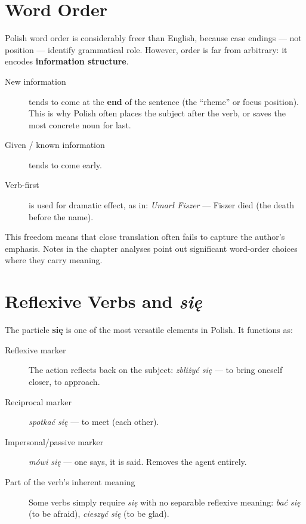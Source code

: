 \section{Word Order}

Polish word order is considerably freer than English, because case 
endings — not position — identify grammatical role. However, order 
is far from arbitrary: it encodes \textbf{information structure}.

\begin{description}
  \item[New information] tends to come at the \textbf{end} of the sentence 
    (the ``rheme'' or focus position). This is why Polish often places the 
    subject after the verb, or saves the most concrete noun for last.
  \item[Given / known information] tends to come early.
  \item[Verb-first] is used for dramatic effect, as in: 
    \textit{Umarł Fiszer} — Fiszer died (the death before the name).
\end{description}

This freedom means that close translation often fails to capture 
the author's emphasis. Notes in the chapter analyses point out 
significant word-order choices where they carry meaning.

\section{Reflexive Verbs and \textit{się}}

The particle \textbf{się} is one of the most versatile elements in 
Polish. It functions as:

\begin{description}
  \item[Reflexive marker] The action reflects back on the subject: 
    \textit{zbliżyć się} — to bring oneself closer, to approach.
  \item[Reciprocal marker] \textit{spotkać się} — to meet (each other).
  \item[Impersonal/passive marker] \textit{mówi się} — one says, 
    it is said. Removes the agent entirely.
  \item[Part of the verb's inherent meaning] Some verbs simply 
    require \textit{się} with no separable reflexive meaning: 
    \textit{bać się} (to be afraid), \textit{cieszyć się} (to be glad).
\end{description}

